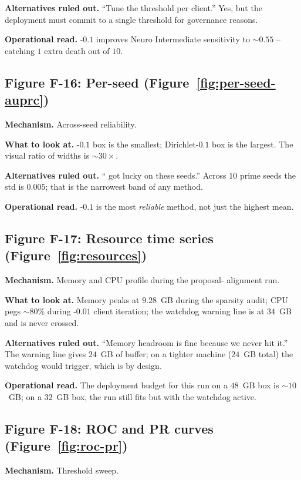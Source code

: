 \textbf{Alternatives ruled out.} ``Tune the threshold per
client.'' Yes, but the deployment must commit to a single
threshold for governance reasons.

\textbf{Operational read.} \fedprox{}-$0.1$ improves Neuro
Intermediate sensitivity to $\sim$$0.55$ -- catching $1$ extra death
out of $10$.

\subsection{Figure F-16: Per-seed \auprc{}
(Figure~\ref{fig:per-seed-auprc})}
\textbf{Mechanism.} Across-seed reliability.

\textbf{What to look at.} \fedprox{}-$0.1$ box is the smallest;
Dirichlet-$0.1$ box is the largest. The visual ratio of widths is
$\sim$$30\!\times$.

\textbf{Alternatives ruled out.} ``\fedprox{} got lucky on these
seeds.'' Across $10$ prime seeds the std is $0.005$; that is the
narrowest band of any method.

\textbf{Operational read.} \fedprox{}-$0.1$ is the most
\emph{reliable} method, not just the highest mean.

\subsection{Figure F-17: Resource time series
(Figure~\ref{fig:resources})}
\textbf{Mechanism.} Memory and CPU profile during the proposal-
alignment run.

\textbf{What to look at.} Memory peaks at $9.28$~GB during the
sparsity audit; CPU pegs $\sim$$80\%$ during \fedprox{}-$0.01$
client iteration; the watchdog warning line is at $34$~GB and is
never crossed.

\textbf{Alternatives ruled out.} ``Memory headroom is fine
because we never hit it.'' The warning line gives $24$~GB of
buffer; on a tighter machine ($24$~GB total) the watchdog would
trigger, which is by design.

\textbf{Operational read.} The deployment budget for this run on
a $48$~GB box is $\sim$$10$~GB; on a $32$~GB box, the run still
fits but with the watchdog active.

\subsection{Figure F-18: ROC and PR curves
(Figure~\ref{fig:roc-pr})}
\textbf{Mechanism.} Threshold sweep.

